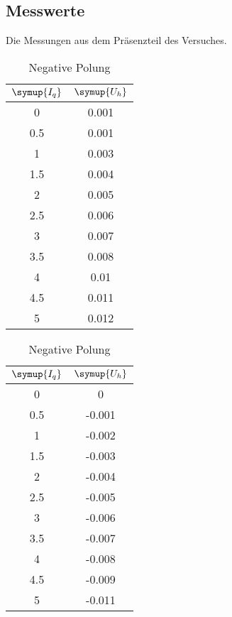 \subsection{Messwerte}
Die Messungen aus dem Präsenzteil des Versuches.


\begin{table}
    \caption*{\textbf{Hallspannung; Magnetfeld konstant}}
    \begin{minipage}{0.49\textwidth}
          \centering  
          \caption{Positive Polung}
          \label{tab:bconst}
          \begin{tabular}{c c}
            \toprule
            $\symup{I_q}$ & $\symup{U_h}$ \\
            \midrule
            0   & 0.001 \\
            0.5 & 0.001 \\
            1   & 0.003 \\
            1.5 & 0.004 \\
            2   & 0.005 \\
            2.5 & 0.006 \\
            3   & 0.007 \\
            3.5 & 0.008 \\
            4   & 0.01  \\
            4.5 & 0.011 \\
            5   & 0.012 \\
            \bottomrule
        \end{tabular}
    \end{minipage}
    \hfill
    \begin{minipage}{0.49\textwidth}
        \centering
          \caption{Negative Polung}
          \label{tab:bconst-}
           \begin{tabular}{c c}
            \toprule
            $\symup{I_q}$ & $\symup{U_h}$ \\
            \midrule
            0   &  0     \\
            0.5 & -0.001 \\
            1   & -0.002 \\
            1.5 & -0.003 \\
            2   & -0.004 \\
            2.5 & -0.005 \\
            3   & -0.006 \\
            3.5 & -0.007 \\
            4   & -0.008 \\
            4.5 & -0.009 \\
            5   & -0.011 \\
            \bottomrule
       \end{tabular}
     \end{minipage}
  \end{table}

